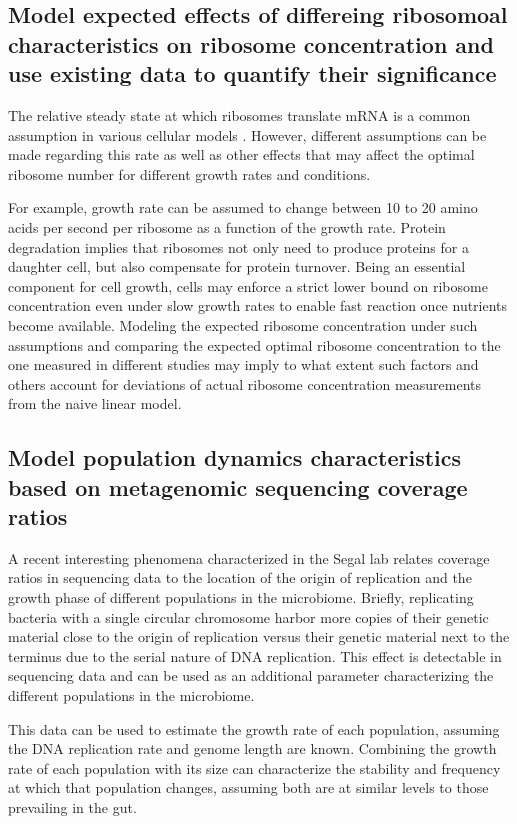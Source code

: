\documentclass[notitlepage]{article}
\begin{document}
\subsection{Model expected effects of differeing ribosomoal characteristics on ribosome concentration and use existing data to quantify their significance}
The relative steady state at which ribosomes translate mRNA is a common assumption in various cellular models \cite{Scott2010}.
However, different assumptions can be made regarding this rate as well as other effects that may affect the optimal ribosome number for different growth rates and conditions.

For example, growth rate can be assumed to change between 10 to 20 amino acids per second per ribosome as a function of the growth rate.
Protein degradation implies that ribosomes not only need to produce proteins for a daughter cell, but also compensate for protein turnover.
Being an essential component for cell growth, cells may enforce a strict lower bound on ribosome concentration even under slow growth rates to enable fast reaction once nutrients become available.
Modeling the expected ribosome concentration under such assumptions and comparing the expected optimal ribosome concentration to the one measured in different studies may imply to what extent such factors and others account for deviations of actual ribosome concentration measurements from the naive linear model.
\subsection{Model population dynamics characteristics based on metagenomic sequencing coverage ratios}
A recent interesting phenomena characterized in the Segal lab relates coverage ratios in sequencing data to the location of the origin of replication and the growth phase of different populations in the microbiome.
Briefly, replicating bacteria with a single circular chromosome harbor more copies of their genetic material close to the origin of replication versus their genetic material next to the terminus due to the serial nature of DNA replication.
This effect is detectable in sequencing data and can be used as an additional parameter characterizing the different populations in the microbiome.

This data can be used to estimate the growth rate of each population, assuming the DNA replication rate and genome length are known.
Combining the growth rate of each population with its size can characterize the stability and frequency at which that population changes, assuming both are at similar levels to those prevailing in the gut.
\end{document}
